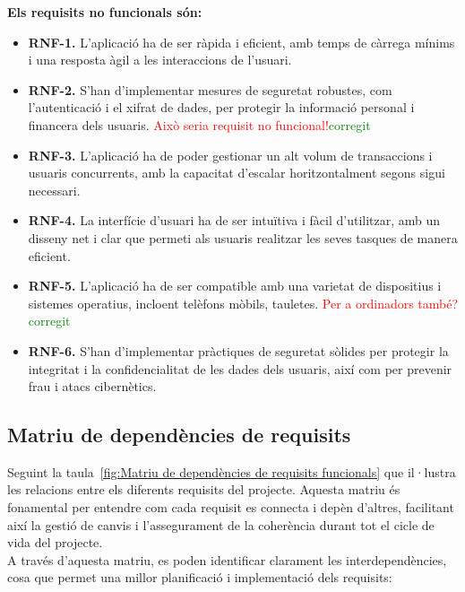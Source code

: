 \documentclass[a4paper,12pt,twoside]{ThesisStyle}
\newcommand{\pau}[1]{\textcolor{red}{#1}}
\newcommand{\sudan}[1]{\textcolor{green}{#1}}
\begin{document}
\textbf{Els requisits no funcionals són:}
\begin{itemize}
    \item \textbf{RNF-1.} L'aplicació ha de ser ràpida i eficient, amb temps de càrrega mínims i una resposta àgil a les interaccions de l'usuari.
    \item \textbf{RNF-2.} S'han d'implementar mesures de seguretat robustes, com l'autenticació i el xifrat de dades, per protegir la informació personal i financera dels usuaris. \pau{Això seria requisit no funcional!}\sudan{corregit}
    \item \textbf{RNF-3.} L'aplicació ha de poder gestionar un alt volum de transaccions i usuaris concurrents, amb la capacitat d'escalar horitzontalment segons sigui necessari.
    \item \textbf{RNF-4.} La interfície d'usuari ha de ser intuïtiva i fàcil d'utilitzar, amb un disseny net i clar que permeti als usuaris realitzar les seves tasques de manera eficient.
    \item \textbf{RNF-5.} L'aplicació ha de ser compatible amb una varietat de dispositius i sistemes operatius, incloent telèfons mòbils, tauletes. \pau{Per a ordinadors també?}\sudan{corregit}
    \item \textbf{RNF-6.} S'han d'implementar pràctiques de seguretat sòlides per protegir la integritat i la confidencialitat de les dades dels usuaris, així com per prevenir frau i atacs cibernètics.

\end{itemize}


\subsection{Matriu de dependències de requisits}
\label{Matriu de dependències de requisits}

Seguint la taula~\ref{fig:Matriu de dependències de requisits funcionals} que il·lustra les relacions entre els diferents requisits del projecte. Aquesta matriu és fonamental per entendre com cada requisit es connecta i depèn d'altres, facilitant així la gestió de canvis i l'assegurament de la coherència durant tot el cicle de vida del projecte.\\

A través d'aquesta matriu, es poden identificar clarament les interdependències, cosa que permet una millor planificació i implementació dels requisits:
\end{document}
